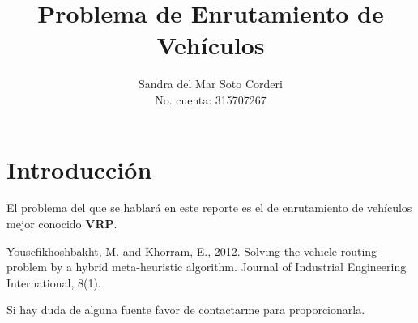 \documentclass{article}
\title{Problema de Enrutamiento de Veh\'iculos}
\author{
  Sandra del Mar Soto Corderi\\
  No. cuenta: 315707267
}
\date{}
\begin{document}
\maketitle

\section{Introducción}

El problema del que se hablará en este reporte es el de enrutamiento de vehículos mejor conocido \textbf{VRP}. 


\begin{thebibliography}{9}
	Yousefikhoshbakht, M. and Khorram, E., 2012. Solving the vehicle routing problem by a hybrid meta-heuristic algorithm. Journal of Industrial Engineering International, 8(1).
	
	
\end{thebibliography}

Si hay duda de alguna fuente favor de contactarme para proporcionarla.
\end{document}
